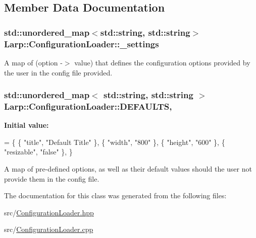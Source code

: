 \subsection{Member Data Documentation}
\hypertarget{classLarp_1_1ConfigurationLoader_ab952b0b19ffa465a73fd58302fccb124}{
\subsubsection[{\-\_\-settings}]{\setlength{\rightskip}{0pt plus 5cm}std\-::unordered\-\_\-map$<$std\-::string, std\-::string$>$ Larp\-::\-Configuration\-Loader\-::\-\_\-settings\hspace{0.3cm}{\ttfamily [private]}}}\label{classLarp_1_1ConfigurationLoader_ab952b0b19ffa465a73fd58302fccb124}
A map of (option -\/$>$ value) that defines the configuration options provided by the user in the config file provided. \hypertarget{classLarp_1_1ConfigurationLoader_a5b5d1d47f1f5cced025a85d248ae57e7}{
\subsubsection[{D\-E\-F\-A\-U\-L\-T\-S}]{\setlength{\rightskip}{0pt plus 5cm}std\-::unordered\-\_\-map$<$ std\-::string, std\-::string $>$ Larp\-::\-Configuration\-Loader\-::\-D\-E\-F\-A\-U\-L\-T\-S\hspace{0.3cm}{\ttfamily [static]}, {\ttfamily [private]}}}\label{classLarp_1_1ConfigurationLoader_a5b5d1d47f1f5cced025a85d248ae57e7}
{\bfseries Initial value\-:}
\begin{DoxyCode}
= \{
    \{ \textcolor{stringliteral}{"title"},     \textcolor{stringliteral}{"Default Title"} \},
    \{ \textcolor{stringliteral}{"width"},     \textcolor{stringliteral}{"800"} \},
    \{ \textcolor{stringliteral}{"height"},    \textcolor{stringliteral}{"600"} \},
    \{ \textcolor{stringliteral}{"resizable"}, \textcolor{stringliteral}{"false"} \},
\}
\end{DoxyCode}
A map of pre-\/defined options, as well as their default values should the user not provide them in the config file. 

The documentation for this class was generated from the following files\-:\begin{DoxyCompactItemize}
\item 
src/\hyperlink{ConfigurationLoader_8hpp}{Configuration\-Loader.\-hpp}\item 
src/\hyperlink{ConfigurationLoader_8cpp}{Configuration\-Loader.\-cpp}\end{DoxyCompactItemize}
